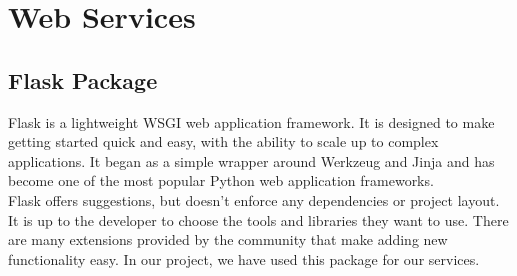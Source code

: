 \section{Web Services}
\subsection{Flask Package}
Flask is a lightweight WSGI \cite{web029} web application framework. It is designed to make getting started quick and easy, with the ability to scale up to complex applications. It began as a simple wrapper around Werkzeug \cite{web030} and Jinja \cite{web031} and has become one of the most popular Python web application frameworks.\\
Flask offers suggestions, but doesn’t enforce any dependencies or project layout. It is up to the developer to choose the tools and libraries they want to use. There are many extensions provided by the community that make adding new functionality easy. In our project, we have used this package for our services.\\